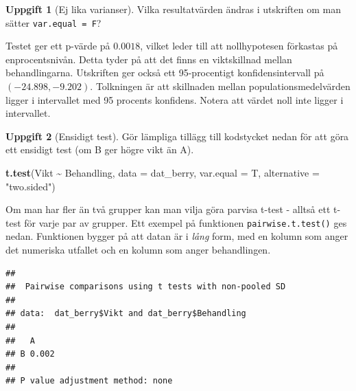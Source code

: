 \documentclass[
]{book}
\newenvironment{Shaded}{\begin{snugshade}}{\end{snugshade}}
\newcommand{\AttributeTok}[1]{\textcolor[rgb]{0.13,0.29,0.53}{#1}}
\newcommand{\FunctionTok}[1]{\textcolor[rgb]{0.13,0.29,0.53}{\textbf{#1}}}
\newcommand{\NormalTok}[1]{#1}
\newcommand{\SpecialCharTok}[1]{\textcolor[rgb]{0.81,0.36,0.00}{\textbf{#1}}}
\newcommand{\StringTok}[1]{\textcolor[rgb]{0.31,0.60,0.02}{#1}}
\theoremstyle{definition}
\theoremstyle{definition}
\theoremstyle{definition}
\newtheorem{exercise}{Uppgift}[chapter]
\theoremstyle{definition}
\theoremstyle{remark}
\begin{document}
\begin{exercise}[Ej lika varianser]
Vilka resultatvärden ändras i utskriften om man sätter \texttt{var.equal\ =\ F}?
\end{exercise}

Testet ger ett p-värde på \(0.0018\), vilket leder till att nollhypotesen förkastas på enprocentsnivån. Detta tyder på att det finns en viktskillnad mellan behandlingarna. Utskriften ger också ett 95-procentigt konfidensintervall på \((-24.898, -9.202)\). Tolkningen är att skillnaden mellan populationsmedelvärden ligger i intervallet med 95 procents konfidens. Notera att värdet noll inte ligger i intervallet.

\begin{exercise}[Ensidigt test]

Gör lämpliga tillägg till kodstycket nedan för att göra ett ensidigt test (om B ger högre vikt än A).

\begin{Shaded}
\begin{Highlighting}[]
\FunctionTok{t.test}\NormalTok{(Vikt }\SpecialCharTok{\textasciitilde{}}\NormalTok{ Behandling, }\AttributeTok{data =}\NormalTok{ dat\_berry, }\AttributeTok{var.equal =}\NormalTok{ T, }\AttributeTok{alternative =} \StringTok{"two.sided"}\NormalTok{)}
\end{Highlighting}
\end{Shaded}

\end{exercise}

Om man har fler än två grupper kan man vilja göra parvisa t-test - alltså ett t-test för varje par av grupper.
Ett exempel på funktionen \texttt{pairwise.t.test()} ges nedan. Funktionen bygger på att datan är i \emph{lång} form, med en kolumn som anger det numeriska utfallet och en kolumn som anger behandlingen.

\begin{Shaded}
\end{Shaded}

\begin{verbatim}
## 
##  Pairwise comparisons using t tests with non-pooled SD 
## 
## data:  dat_berry$Vikt and dat_berry$Behandling 
## 
##   A    
## B 0.002
## 
## P value adjustment method: none
\end{verbatim}
\end{document}
